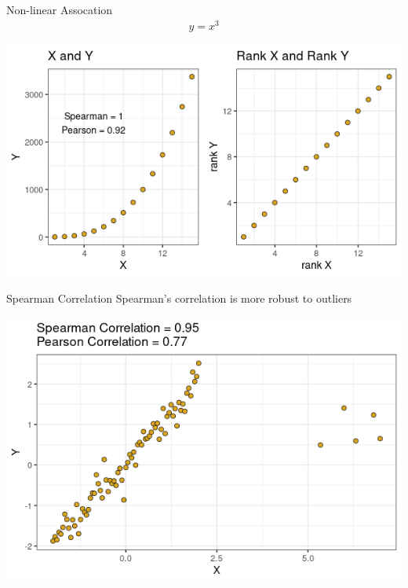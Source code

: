 \documentclass{beamer}
\begin{document}
\begin{frame}{Non-linear Assocation}
\begin{align*}
y = x^3
\end{align*}
\begin{center}
\includegraphics[scale=0.5]{cubic_actually.png}
\end{center}
\end{frame}

\begin{frame}{Spearman Correlation}
Spearman's correlation is more robust to outliers
\begin{center}
\includegraphics[scale=0.5]{outliers.png}
\end{center}
\end{frame}
\end{document}
